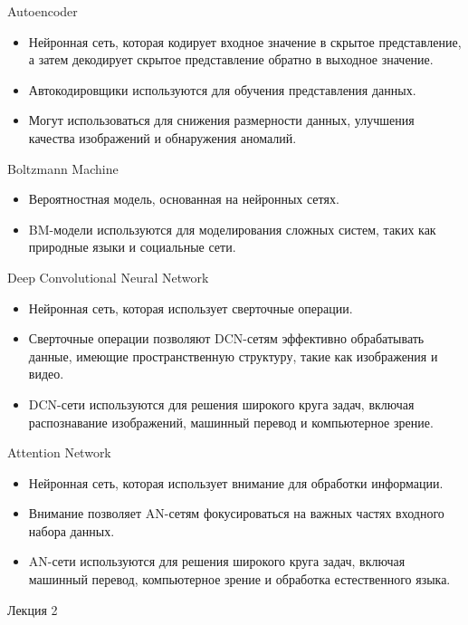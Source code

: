\documentclass{beamer}
\begin{document}
\begin{frame}{Autoencoder}


\begin{itemize}
\item Нейронная сеть, которая кодирует входное значение в скрытое представление, а затем декодирует скрытое представление обратно в выходное значение.
\item Автокодировщики используются для обучения представления данных.
\item Могут использоваться для снижения размерности данных, улучшения качества изображений и обнаружения аномалий.
\end{itemize}
\end{frame}

\begin{frame}{Boltzmann Machine}


\begin{itemize}
\item Вероятностная модель, основанная на нейронных сетях.
\item BM-модели используются для моделирования сложных систем, таких как природные языки и социальные сети.
\end{itemize}
\end{frame}

\begin{frame}{Deep Convolutional Neural Network}


\begin{itemize}
\item Нейронная сеть, которая использует сверточные операции.
\item Сверточные операции позволяют DCN-сетям эффективно обрабатывать данные, имеющие пространственную структуру, такие как изображения и видео.
\item DCN-сети используются для решения широкого круга задач, включая распознавание изображений, машинный перевод и компьютерное зрение.
\end{itemize}
\end{frame}

\begin{frame}{Attention Network}


\begin{itemize}
\item Нейронная сеть, которая использует внимание для обработки информации.
\item Внимание позволяет AN-сетям фокусироваться на важных частях входного набора данных.
\item AN-сети используются для решения широкого круга задач, включая машинный перевод, компьютерное зрение и обработка естественного языка.
\end{itemize}
\end{frame}




\begin{frame}{Лекция 2}

\end{frame}
\end{document}

